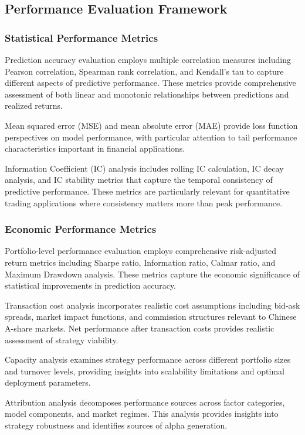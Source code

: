 \documentclass[conference]{IEEEtran}
\begin{document}
\subsection{Performance Evaluation Framework}

\subsubsection{Statistical Performance Metrics}

Prediction accuracy evaluation employs multiple correlation measures including Pearson correlation, Spearman rank correlation, and Kendall's tau to capture different aspects of predictive performance. These metrics provide comprehensive assessment of both linear and monotonic relationships between predictions and realized returns.

Mean squared error (MSE) and mean absolute error (MAE) provide loss function perspectives on model performance, with particular attention to tail performance characteristics important in financial applications.

Information Coefficient (IC) analysis includes rolling IC calculation, IC decay analysis, and IC stability metrics that capture the temporal consistency of predictive performance. These metrics are particularly relevant for quantitative trading applications where consistency matters more than peak performance.

\subsubsection{Economic Performance Metrics}

Portfolio-level performance evaluation employs comprehensive risk-adjusted return metrics including Sharpe ratio, Information ratio, Calmar ratio, and Maximum Drawdown analysis. These metrics capture the economic significance of statistical improvements in prediction accuracy.

Transaction cost analysis incorporates realistic cost assumptions including bid-ask spreads, market impact functions, and commission structures relevant to Chinese A-share markets. Net performance after transaction costs provides realistic assessment of strategy viability.

Capacity analysis examines strategy performance across different portfolio sizes and turnover levels, providing insights into scalability limitations and optimal deployment parameters.

Attribution analysis decomposes performance sources across factor categories, model components, and market regimes. This analysis provides insights into strategy robustness and identifies sources of alpha generation.
\end{document}
